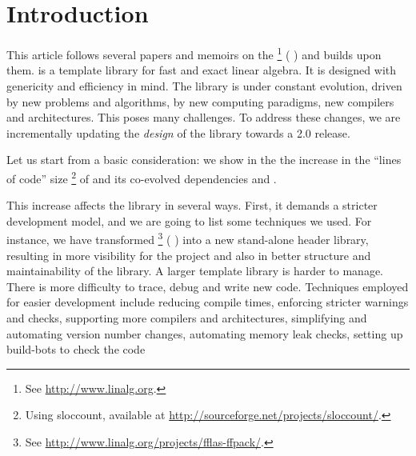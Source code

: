 \section{Introduction}
%
This article follows several papers and memoirs on the \linbox%
%
\footnote{See \url{http://www.linalg.org}.}
%
(\cf{} \cite{Giorgi:2004:these,Turner:2002:these,Boyer:2012:these,Dumas:2002:icms,Dumas:2010:lbpar})
and builds upon them.
%
\linbox is a \cpp template library for fast and exact linear algebra. It is designed with genericity
and efficiency in mind.
%
%
The \linbox library is under constant evolution, driven by new problems and
algorithms, by new computing paradigms, new compilers and architectures. This
poses many challenges. To address these changes, we are incrementally
updating the \emph{design} of the library towards a \textsf{2.0} release.
%
\par
%
Let us start from a basic consideration: we show in the  the
increase in the ``lines of code'' size
%
\footnote{Using \textsf{sloccount}, available at
\url{http://sourceforge.net/projects/sloccount/}.}
%
of \linbox and its co-evolved dependencies \givaro and \fflasffpack.
%
%

%
This increase affects the library in several ways.  First, it demands a
stricter development model, and we are going to list some techniques we used.
For instance, we have transformed \fflasffpack %
%
\footnote{See \url{http://www.linalg.org/projects/fflas-ffpack/}.}
(\cf{} \cite{Dumas:2008:Flas}) into a new stand-alone header library, resulting
in more visibility for the \fflasffpack project
and also in better structure and maintainability of the library.
%
%
A larger template library is harder to manage. There is more difficulty
to trace, debug and write new code. Techniques employed
for easier development include reducing
compile times, enforcing stricter warnings and checks, supporting more
compilers and architectures, simplifying and automating version number
changes, automating memory leak checks, setting up build-bots to check the code
